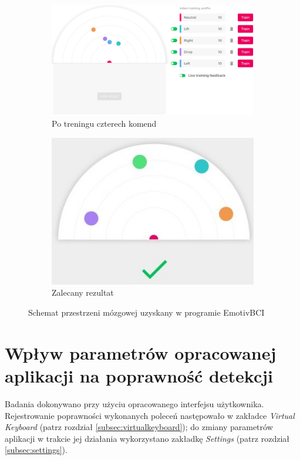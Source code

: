 \documentclass[skorowidz,skroty]{dyplomWEZUT}
\begin{document}
\begin{figure}[htb]
    \medskip
    \begin{subfigure}{0.49\textwidth}
    \includegraphics[width=\linewidth]{graphic/4commands}
    \caption{Po treningu czterech komend\label{fig:brainmap_four}}
    \end{subfigure}\hspace*{\fill}
    \begin{subfigure}{0.49\textwidth}
    \includegraphics[width=\linewidth]{graphic/propercommands}
    \caption{Zalecany rezultat\label{fig:brainmap_recommended}}
    \end{subfigure}
    
    \caption{Schemat przestrzeni mózgowej uzyskany w programie EmotivBCI\label{fig:brainmap}}
\end{figure}


\section{Wpływ parametrów opracowanej aplikacji na poprawność detekcji}
Badania dokonywano przy użyciu opracowanego interfejsu użytkownika. Rejestrowanie poprawności wykonanych poleceń następowało w zakładce \textit{Virtual Keyboard} (patrz rozdział \vref{subsec:virtualkeyboard}); do zmiany parametrów aplikacji w trakcie jej działania wykorzystano zakładkę \textit{Settings} (patrz rozdział \vref{subsec:settings}).
\end{document}
